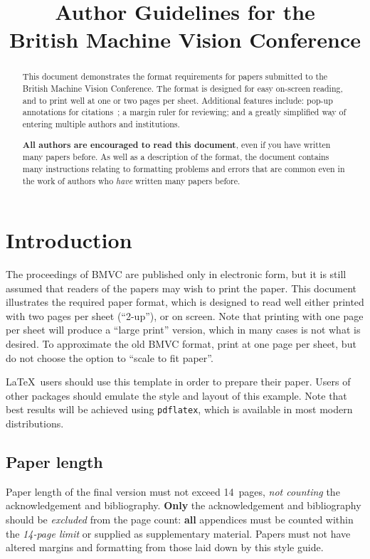 \documentclass{bmvc2k}
\title{Author Guidelines for the\\ British Machine Vision Conference}
\begin{document}
\maketitle

\begin{abstract}
This document demonstrates the format requirements for papers submitted
to the British Machine Vision Conference.  The format is designed for
easy on-screen reading, and to print well at one or two pages per sheet.
Additional features include: pop-up annotations for
citations~\cite{Authors06,Mermin89}; a margin ruler for reviewing; and a
greatly simplified way of entering multiple authors and institutions.

{\bf All authors are encouraged to read this document}, even if you have
written many papers before.  As well as a description of the format, the
document contains many instructions relating to formatting problems and
errors that are common even in the work of authors who {\em have}
written many papers before.
\end{abstract}

\section{Introduction}
\label{sec:intro}
The proceedings of BMVC are published only in electronic form, but it is still assumed
that readers of the papers may wish to print the paper.   This document
illustrates the required paper format, which is designed to read well either printed
with two pages per sheet (``2-up''), or on screen.  Note that printing with one page
per sheet will produce a ``large print'' version, which in many cases is not what is desired.
To approximate the old BMVC format, print at one page per sheet, but do not choose
the option to ``scale to fit paper''.

\LaTeX\ users should use this template in order to prepare their paper.
Users of other packages should emulate the style and layout of this
example.  Note that best results will be achieved using {\tt pdflatex},
which is available in most modern distributions.

\subsection{Paper length}
Paper length of the final version must not exceed 14~pages, {\em not counting} the acknowledgement and bibliography.
{\bf Only}  the acknowledgement and bibliography should be {\em excluded} from the page count: {\bf all} appendices must be counted within the {\em 14-page limit} or supplied as supplementary material. Papers must not have altered margins and formatting from those laid down by this style guide.
\end{document}
